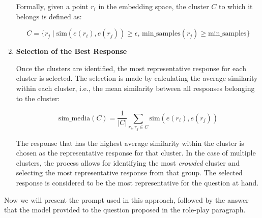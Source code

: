 \begin{enumerate}
Formally, given a point \( r_i \) in the embedding space, the cluster \( C \) to which it belongs is defined as:

\[
C = \{ r_j \mid \text{sim}(e(r_i), e(r_j)) \geq \epsilon, \, \text{min\_samples}(r_j) \geq \text{min\_samples} \}
\]

    \item\textbf{Selection of the Best Response}

Once the clusters are identified, the most representative response for each cluster is selected. The selection is made by calculating the average similarity within each cluster, i.e., the mean similarity between all responses belonging to the cluster:

\[
\text{sim\_media}(C) = \frac{1}{|C|} \sum_{r_i, r_j \in C} \text{sim}(e(r_i), e(r_j))
\]

The response that has the highest average similarity within the cluster is chosen as the representative response for that cluster. In the case of multiple clusters, the process allows for identifying the most \textit{crowded} cluster and selecting the most representative response from that group. The selected response is considered to be the most representative for the question at hand.
\end{enumerate}
Now we will present the prompt used in this approach, followed by the answer that the model provided to the question proposed in the role-play paragraph.
